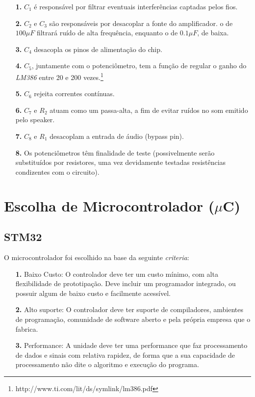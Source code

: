\documentclass[10pt,a4paper]{report}
\begin{document}
	\begin{itemize}
		\item[{\bf 1.}]$C_1$ é responsável por filtrar eventuais interferências captadas pelos fios.
		\item[{\bf 2.}]$C_2$ e $C_3$ são responsáveis por desacoplar a fonte do amplificador. o de $100\mu{F}$ filtrará ruído de alta frequência, enquanto o de $0.1\mu{F}$, de baixa.
		\item[{\bf 3.}]$C_4$ desacopla os pinos de alimentação do chip.
		\item[{\bf 4.}]$C_5$, juntamente com o potenciômetro, tem a função de regular o ganho do {\it LM386} entre 20 e 200 vezes.\footnote{http://www.ti.com/lit/ds/symlink/lm386.pdf}
		\item[{\bf 5.}]$C_6$ rejeita correntes contínuas.
		\item[{\bf 6.}]$C_7$ e $R_2$ atuam como um passa-alta, a fim de evitar ruídos no som emitido pelo speaker.
		\item[{\bf 7.}]$C_8$ e $R_1$ desacoplam a entrada de áudio (bypass pin).
		\item[{\bf 8.}]Os potenciômetros têm finalidade de teste (possivelmente serão substituídos por resistores, uma vez devidamente testadas resistências condizentes com o circuito).
	\end{itemize}

\section{Escolha de Microcontrolador ($\mu$C)}
	\subsection{STM32}
	O microcontrolador foi escolhido na base da seguinte {\it criteria}:
	
	\begin{itemize}
		\item[{\bf 1.}]Baixo Custo: O controlador deve ter um custo mínimo, com alta flexibilidade de prototipação. Deve incluir um programador integrado, ou possuir algum de baixo custo e facilmente acessível.
		
		\item[{\bf 2.}] Alto suporte: O controlador deve ter suporte de compiladores, ambientes de programação, comunidade de software aberto e pela própria empresa que o fabrica.
		
		\item[{\bf 3.}] Performance: A unidade deve ter uma performance que faz processamento de dados e sinais com relativa rapidez, de forma que a sua capacidade de processamento não dite o algoritmo e execução do programa.
	
	\end{itemize}
\end{document}
